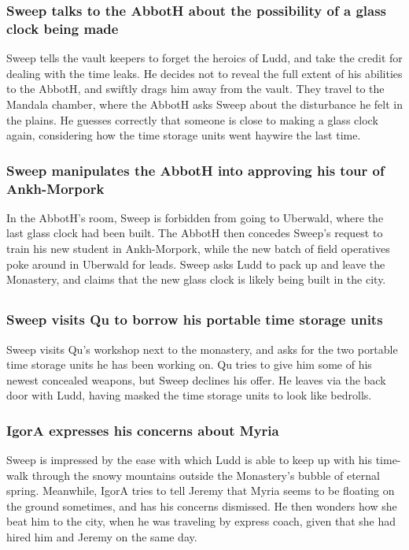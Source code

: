 \subsubsection{\Gls{Sweep} talks to the \Gls{AbbotH} about the possibility of a glass clock being
    made}
\Gls{Sweep} tells the vault keepers to forget the heroics of \Gls{Ludd}, and take the credit for
dealing with the time leaks. He decides not to reveal the full extent of his abilities to the
\Gls{AbbotH}, and swiftly drags him away from the vault. They travel to the Mandala chamber, where
the \Gls{AbbotH} asks \Gls{Sweep} about the disturbance he felt in the plains. He guesses correctly
that someone is close to making a glass clock again, considering how the time storage units went
haywire the last time.

\subsubsection{\Gls{Sweep} manipulates the \Gls{AbbotH} into approving his tour of Ankh-Morpork}
In the \Gls{AbbotH}'s room, \Gls{Sweep} is forbidden from going to Uberwald, where the last glass
clock had been built. The \Gls{AbbotH} then concedes \Gls{Sweep}'s request to train his new
student in Ankh-Morpork, while the new batch of field operatives poke around in Uberwald for leads.
\Gls{Sweep} asks \Gls{Ludd} to pack up and leave the Monastery, and claims that the new glass clock
is likely being built in the city.

\subsection{}
\subsubsection{\Gls{Sweep} visits \Gls{Qu} to borrow his portable time storage units}
\Gls{Sweep} visits \Gls{Qu}'s workshop next to the monastery, and asks for the two portable time
storage units he has been working on. \Gls{Qu} tries to give him some of his newest concealed
weapons, but \Gls{Sweep} declines his offer. He leaves via the back door with \Gls{Ludd}, having
masked the time storage units to look like bedrolls.

\subsubsection{\Gls{IgorA} expresses his concerns about \Gls{Myria}}
\Gls{Sweep} is impressed by the ease with which \Gls{Ludd} is able to keep up with his time-walk
through the snowy mountains outside the Monastery's bubble of eternal spring. Meanwhile, \Gls{IgorA}
tries to tell \Gls{Jeremy} that \Gls{Myria} seems to be floating on the ground sometimes, and has
his concerns dismissed. He then wonders how she beat him to the city, when he was traveling by
express coach, given that she had hired him and \Gls{Jeremy} on the same day.

